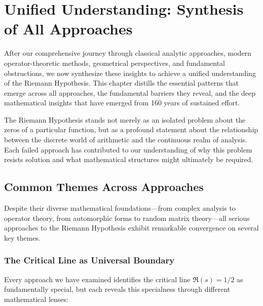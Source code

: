 \chapter{Unified Understanding: Synthesis of All Approaches}
\label{ch:unified}

After our comprehensive journey through classical analytic approaches, modern operator-theoretic methods, geometrical perspectives, and fundamental obstructions, we now synthesize these insights to achieve a unified understanding of the Riemann Hypothesis. This chapter distills the essential patterns that emerge across all approaches, the fundamental barriers they reveal, and the deep mathematical insights that have emerged from 160 years of sustained effort.

The Riemann Hypothesis stands not merely as an isolated problem about the zeros of a particular function, but as a profound statement about the relationship between the discrete world of arithmetic and the continuous realm of analysis. Each failed approach has contributed to our understanding of why this problem resists solution and what mathematical structures might ultimately be required.

\section{Common Themes Across Approaches}
\label{sec:common_themes}

Despite their diverse mathematical foundations—from complex analysis to operator theory, from automorphic forms to random matrix theory—all serious approaches to the Riemann Hypothesis exhibit remarkable convergence on several key themes.

\subsection{The Critical Line as Universal Boundary}
\label{subsec:critical_boundary}

Every approach we have examined identifies the critical line $\Re(s) = 1/2$ as fundamentally special, but each reveals this specialness through different mathematical lenses:

